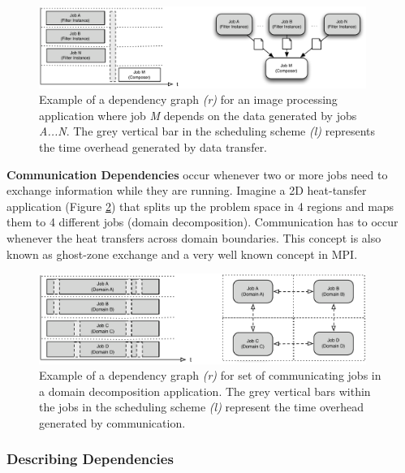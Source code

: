     \begin{figure}[bth!]
    \begin{center}
      \includegraphics[width=0.95\textwidth]{figures/data_dependencies}
      \caption{\label{fig:data_dependencies} Example of a dependency graph \textit{(r)} for an image processing application where job \textit{M} depends on the data generated by jobs \textit{A...N}. The grey vertical bar in the scheduling scheme \textit{(l)} represents the time overhead generated by data transfer.}
    \end{center}
  \end{figure}


\textbf{Communication Dependencies} occur whenever two or more jobs need to exchange information while they are running. Imagine a 2D heat-tansfer application (Figure \ref{fig:comm_dependencies}) that splits up the problem space in 4 regions and maps them to 4 different jobs (domain decomposition). Communication has to occur whenever the heat transfers across domain boundaries. This concept is also known as ghost-zone exchange and a very well known concept in MPI.

    \begin{figure}[h]
    \begin{center}
      \includegraphics[width=0.95\textwidth]{figures/comm_dependencies}
      \caption{\label{fig:comm_dependencies} Example of a dependency graph \textit{(r)} for set of communicating jobs in a domain decomposition application. The grey vertical bars within the jobs in the scheduling scheme \textit{(l)} represent the time overhead generated by communication.}
    \end{center}
  \end{figure}

\subsubsection{Describing Dependencies}

